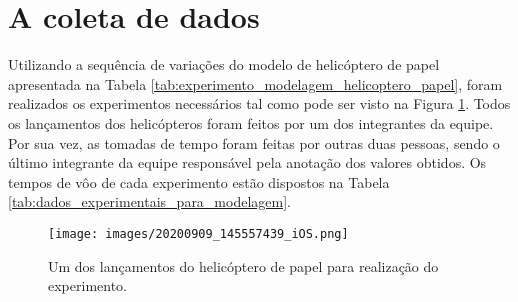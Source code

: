 \section{A coleta de dados}
\label{sec:primeiro_experimento_a_coleta_de_dados}


Utilizando a sequência de variações do modelo de helicóptero de papel apresentada na Tabela \ref{tab:experimento_modelagem_helicoptero_papel}, foram realizados os experimentos necessários tal como pode ser visto na Figura \ref{fig:primeiro_experimento}. Todos os lançamentos dos helicópteros foram feitos por um dos integrantes da equipe. Por sua vez, as tomadas de tempo foram feitas por outras duas pessoas, sendo o último integrante da equipe responsável pela anotação dos valores obtidos. Os tempos de vôo de cada experimento estão dispostos na Tabela \ref{tab:dados_experimentais_para_modelagem}.

\begin{figure}[H]
  \centering
  \caption{Um dos lançamentos do helicóptero de papel para realização do experimento.}
  \texttt{[image: images/20200909\_145557439\_iOS.png]}
  \label{fig:primeiro_experimento}
\end{figure}